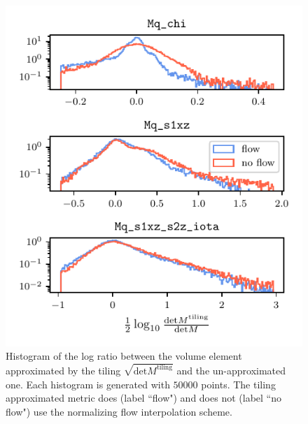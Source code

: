 \documentclass[twocolumn,showpacs,preprintnumbers,nofootinbib,prd,
superscriptaddress,10pt]{revtex4-2}
\begin{document}
\begin{figure}[t]
	\centering
	\includegraphics{tiling_validation}
	\caption{Histogram of the log ratio between the volume element approximated by the tiling $\sqrt{\text{det}M^\text{tiling}}$ and the un-approximated one. Each histogram is generated with $50000$ points. The tiling approximated metric does (label ``flow") and does not (label ``no flow") use the normalizing flow interpolation scheme.}
	\label{fig:tiling_validation}
\end{figure}
\end{document}
